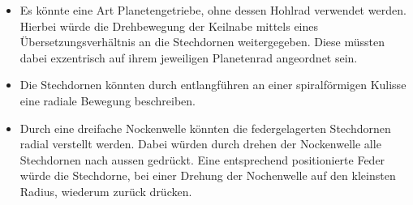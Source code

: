 \begin{itemize}
	\item Es könnte eine Art Planetengetriebe, ohne dessen Hohlrad verwendet werden. Hierbei würde die Drehbewegung der Keilnabe mittels eines Übersetzungsverhältnis an die Stechdornen weitergegeben. Diese müssten dabei exzentrisch auf ihrem jeweiligen Planetenrad angeordnet sein.
	\item Die Stechdornen könnten durch entlangführen an einer spiralförmigen Kulisse eine radiale Bewegung beschreiben.
	\item Durch eine dreifache Nockenwelle könnten die federgelagerten Stechdornen radial verstellt werden. Dabei würden durch drehen der Nockenwelle alle Stechdornen nach aussen gedrückt. Eine entsprechend positionierte Feder würde die Stechdorne, bei einer Drehung der Nochenwelle auf den kleinsten Radius, wiederum zurück drücken.
\end{itemize}

